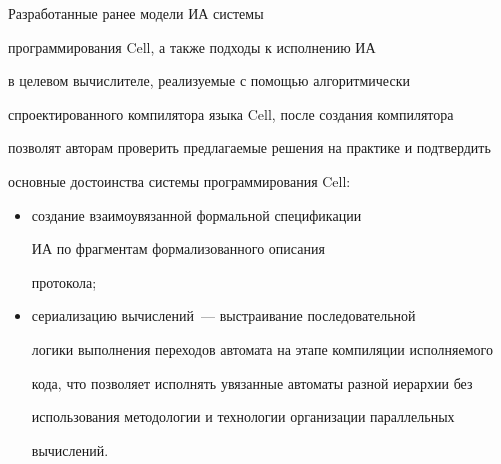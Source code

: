      


     Разработанные ранее модели ИА системы 


программирования Cell, а также подходы к исполнению ИА 


в целевом вычислителе, реализуемые с помощью алгоритмически 


спроектированного компилятора языка Cell, после создания компилятора 


позволят авторам проверить предлагаемые решения на практике и подтвердить 


основные достоинства системы программирования Cell:


     \begin{itemize}


     \item создание взаимоувязанной формальной спецификации 


ИА по фрагментам формализованного описания 


протокола;


     \item сериализацию вычислений~--- выстраивание последовательной 


логики выполнения переходов автомата на этапе компиляции исполняемого 


кода, что позволяет исполнять увязанные автоматы разной иерархии без 


использования методологии и технологии организации параллельных 


вычислений.


     \end{itemize}


     


